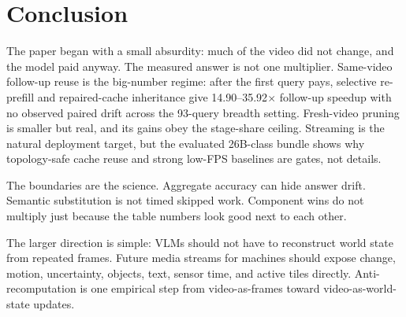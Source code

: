 \section{Conclusion}

The paper began with a small absurdity: much of the video did not change, and
the model paid anyway. The measured answer is not one multiplier.
Same-video follow-up reuse is the big-number regime: after the first query
pays, selective re-prefill and repaired-cache inheritance give
14.90--35.92$\times$ follow-up speedup with no observed paired drift across
the 93-query breadth setting. Fresh-video pruning is smaller but real, and its
gains obey the stage-share ceiling. Streaming is the natural deployment target,
but the evaluated 26B-class bundle shows why topology-safe cache reuse and strong
low-FPS baselines are gates, not details.

The boundaries are the science. Aggregate accuracy can hide answer drift.
Semantic substitution is not timed skipped work. Component wins do not multiply
just because the table numbers look good next to each other.

The larger direction is simple: VLMs should not have to reconstruct world state
from repeated frames. Future media streams for machines should expose change,
motion, uncertainty, objects, text, sensor time, and active tiles directly.
Anti-recomputation is one empirical step from video-as-frames toward
video-as-world-state updates.

